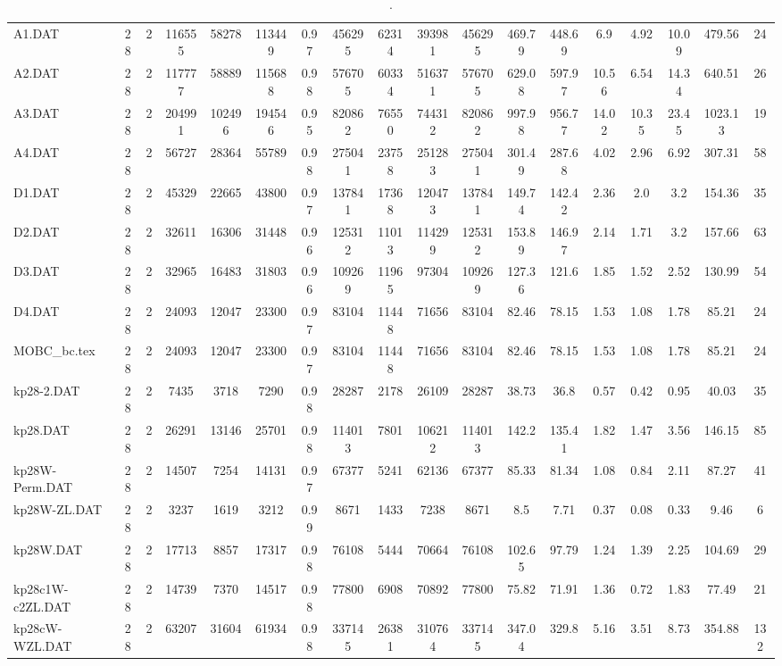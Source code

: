\begin{sidewaystable}[h]
{\begin{tabular}{lccccccccccccccccc}
A1.DAT & 28 & 2 & 116555 & 58278 & 113449 & 0.97 & 456295 & 62314 & 393981 & 456295 & 469.79 & 448.69 & 6.9 & 4.92 & 10.09 & 479.56 & 24\\
A2.DAT & 28 & 2 & 117777 & 58889 & 115688 & 0.98 & 576705 & 60334 & 516371 & 576705 & 629.08 & 597.97 & 10.56 & 6.54 & 14.34 & 640.51 & 26\\
A3.DAT & 28 & 2 & 204991 & 102496 & 194546 & 0.95 & 820862 & 76550 & 744312 & 820862 & 997.98 & 956.77 & 14.02 & 10.35 & 23.45 & 1023.13 & 19\\
A4.DAT & 28 & 2 & 56727 & 28364 & 55789 & 0.98 & 275041 & 23758 & 251283 & 275041 & 301.49 & 287.68 & 4.02 & 2.96 & 6.92 & 307.31 & 58\\
D1.DAT & 28 & 2 & 45329 & 22665 & 43800 & 0.97 & 137841 & 17368 & 120473 & 137841 & 149.74 & 142.42 & 2.36 & 2.0 & 3.2 & 154.36 & 35\\
D2.DAT & 28 & 2 & 32611 & 16306 & 31448 & 0.96 & 125312 & 11013 & 114299 & 125312 & 153.89 & 146.97 & 2.14 & 1.71 & 3.2 & 157.66 & 63\\
D3.DAT & 28 & 2 & 32965 & 16483 & 31803 & 0.96 & 109269 & 11965 & 97304 & 109269 & 127.36 & 121.6 & 1.85 & 1.52 & 2.52 & 130.99 & 54\\
D4.DAT & 28 & 2 & 24093 & 12047 & 23300 & 0.97 & 83104 & 11448 & 71656 & 83104 & 82.46 & 78.15 & 1.53 & 1.08 & 1.78 & 85.21 & 24\\
MOBC\_bc.tex & 28 & 2 & 24093 & 12047 & 23300 & 0.97 & 83104 & 11448 & 71656 & 83104 & 82.46 & 78.15 & 1.53 & 1.08 & 1.78 & 85.21 & 24\\
kp28-2.DAT & 28 & 2 & 7435 & 3718 & 7290 & 0.98 & 28287 & 2178 & 26109 & 28287 & 38.73 & 36.8 & 0.57 & 0.42 & 0.95 & 40.03 & 35\\
kp28.DAT & 28 & 2 & 26291 & 13146 & 25701 & 0.98 & 114013 & 7801 & 106212 & 114013 & 142.2 & 135.41 & 1.82 & 1.47 & 3.56 & 146.15 & 85\\
kp28W-Perm.DAT & 28 & 2 & 14507 & 7254 & 14131 & 0.97 & 67377 & 5241 & 62136 & 67377 & 85.33 & 81.34 & 1.08 & 0.84 & 2.11 & 87.27 & 41\\
kp28W-ZL.DAT & 28 & 2 & 3237 & 1619 & 3212 & 0.99 & 8671 & 1433 & 7238 & 8671 & 8.5 & 7.71 & 0.37 & 0.08 & 0.33 & 9.46 & 6\\
kp28W.DAT & 28 & 2 & 17713 & 8857 & 17317 & 0.98 & 76108 & 5444 & 70664 & 76108 & 102.65 & 97.79 & 1.24 & 1.39 & 2.25 & 104.69 & 29\\
kp28c1W-c2ZL.DAT & 28 & 2 & 14739 & 7370 & 14517 & 0.98 & 77800 & 6908 & 70892 & 77800 & 75.82 & 71.91 & 1.36 & 0.72 & 1.83 & 77.49 & 21\\
kp28cW-WZL.DAT & 28 & 2 & 63207 & 31604 & 61934 & 0.98 & 337145 & 26381 & 310764 & 337145 & 347.04 & 329.8 & 5.16 & 3.51 & 8.73 & 354.88 & 132\\
\bottomrule
\end{tabular}%
}%
\caption{.}
\label{tab:table_bc}
\end{sidewaystable}

